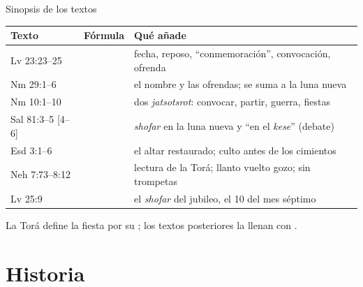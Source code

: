 \begin{frame}{Sinopsis de los textos}
\renewcommand{\arraystretch}{1.12}\scriptsize
\begin{tabular}{@{}L{2.1cm}L{3.0cm}L{6.5cm}@{}}
\toprule
\textbf{Texto} & \textbf{Fórmula} & \textbf{Qué añade} \\ \midrule
Lv 23:23--25 &  & fecha, reposo, ``conmemoración'', convocación, ofrenda \\
Nm 29:1--6 &  & el nombre y las ofrendas; se suma a la luna nueva \\
Nm 10:1--10 &  & dos \emph{jatsotsrot}: convocar, partir, guerra, fiestas \\
Sal 81:3--5 [4--6] &  & \emph{shofar} en la luna nueva y ``en el \emph{kese}'' (debate) \\
Esd 3:1--6 &  & el altar restaurado; culto antes de los cimientos \\
Neh 7:73--8:12 &  & lectura de la Torá; llanto vuelto gozo; sin trompetas \\
Lv 25:9 &  & el \emph{shofar} del jubileo, el 10 del mes séptimo \\
\bottomrule
\end{tabular}\par\medskip
\small\RaggedRight La Torá define la fiesta por su ; los textos posteriores la llenan con .
\end{frame}

\section{Historia}

